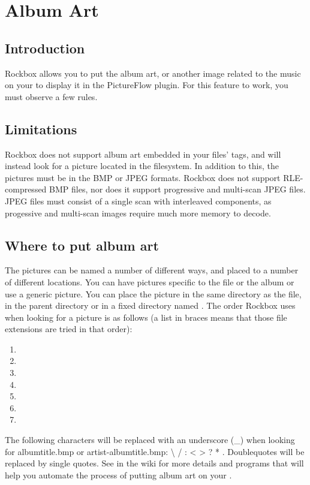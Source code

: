 \chapter{\label{ref:album_art}Album Art}
\section{Introduction}

Rockbox allows you to put the album art, or another image related to the music
on your \dap{} to display it in the PictureFlow plugin. For this feature to work, you must observe a few rules.

\section{Limitations}

Rockbox does not support album art embedded in your files' tags, and will
instead look for a picture located in the filesystem. In addition to this, the
pictures must be in the BMP or JPEG formats. Rockbox does not support
RLE-compressed BMP files, nor does it support progressive and multi-scan
JPEG files. JPEG files must consist of a single scan with interleaved components, 
as progessive and multi-scan images require much more memory to decode.

\section{Where to put album art}

The pictures can be named a number of different ways, and placed to a number of
different locations. You can have pictures specific to the file or the album
or use a generic picture. You can place the picture in the same directory
as the file, in the parent directory or in a fixed directory named
. The order Rockbox uses when looking for a picture
is as follows (a list in braces means that those file extensions are tried in
that order):

\begin{enumerate}
\item  {}
\item  {}
\item  {}
\item  {}
\item  {}
\item  {}
\item  {}
\end{enumerate}

The following characters will be replaced with an underscore (\_) when looking
for albumtitle.bmp or artist-albumtitle.bmp: \textbackslash{} / : \textless{}
\textgreater{} ? * \textbar{}. Doublequotes will be replaced by single quotes.
See  in the wiki for more details and programs that will
help you automate the process of putting album art on your \dap{}.
